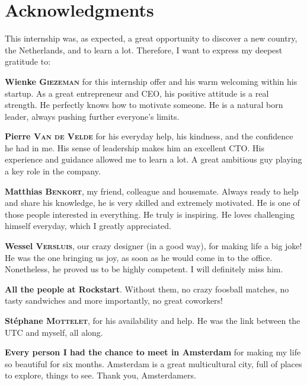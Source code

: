 \chapter*{\centering\vfill Acknowledgments}

This internship was, as expected, a great opportunity to discover a new country, the Netherlands, and to learn a lot. Therefore, I want to express my deepest gratitude to:

\bigskip

\textbf{Wienke \textsc{Giezeman}} for this internship offer and his warm welcoming within his startup. As a great entrepreneur and CEO, his positive attitude is a real strength. He perfectly knows how to motivate someone. He is a natural born leader, always pushing further everyone's limits.

\bigskip

\textbf{Pierre \textsc{Van de Velde}} for his everyday help, his kindness, and the confidence he had in me. His sense of leadership makes him an excellent CTO. His experience and guidance allowed me to learn a lot. A great ambitious guy playing a key role in the company.

\bigskip

\textbf{Matthias \textsc{Benkort}}, my friend, colleague and housemate. Always ready to help and share his knowledge, he is very skilled and extremely motivated. He is one of those people interested in everything. He truly is inspiring. He loves challenging himself everyday, which I greatly appreciated.

\bigskip

\textbf{Wessel \textsc{Versluis}}, our crazy designer (in a good way), for making life a big joke! He was the one bringing us joy, as soon as he would come in to the office. Nonetheless, he proved us to be highly competent. I will definitely miss him.

\bigskip

\textbf{All the people at Rockstart}. Without them, no crazy foosball matches, no tasty sandwiches and more importantly, no great coworkers!

\bigskip

\textbf{Stéphane \textsc{Mottelet}}, for his availability and help. He was the link between the UTC and myself, all along.

\bigskip

\textbf{Every person I had the chance to meet in Amsterdam} for making my life so beautiful for six months. Amsterdam is a great multicultural city, full of places to explore, things to see. Thank you, Amsterdamers.
\vfill
